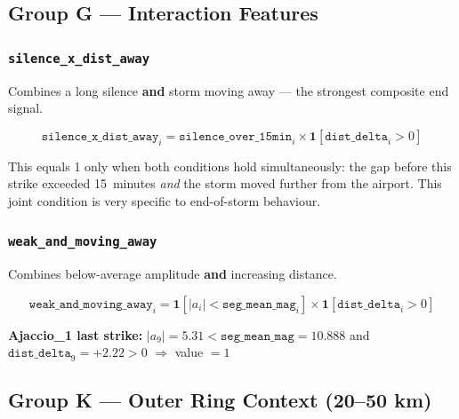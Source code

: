 \documentclass[12pt,a4paper]{article}
\newcommand{\feat}[1]{\texttt{\textbf{#1}}}
\begin{document}
\vspace{1em}

\subsection{Group G --- Interaction Features}

\subsubsection*{\feat{silence\_x\_dist\_away}}

Combines a long silence \textbf{and} storm moving away --- the strongest composite end signal.

\begin{formulabox}
\[
  \texttt{silence\_x\_dist\_away}_i
  = \texttt{silence\_over\_15min}_i \times \mathbf{1}[\texttt{dist\_delta}_i > 0]
\]
\end{formulabox}

This equals 1 only when both conditions hold simultaneously: the gap before this strike exceeded 15~minutes \textit{and} the storm moved further from the airport. This joint condition is very specific to end-of-storm behaviour.

\subsubsection*{\feat{weak\_and\_moving\_away}}

Combines below-average amplitude \textbf{and} increasing distance.

\begin{formulabox}
\[
  \texttt{weak\_and\_moving\_away}_i
  = \mathbf{1}\!\left[|a_i| < \texttt{seg\_mean\_mag}_i\right]
    \times
    \mathbf{1}[\texttt{dist\_delta}_i > 0]
\]
\end{formulabox}

\textbf{Ajaccio\_1 last strike:}
$|a_9| = 5.31 < \texttt{seg\_mean\_mag} = 10.888$ \checkmark \;and\; $\texttt{dist\_delta}_9 = +2.22 > 0$ \checkmark \;$\Rightarrow$ value $= 1$

\vspace{1em}

\subsection{Group K --- Outer Ring Context (20--50 km)}
\end{document}
